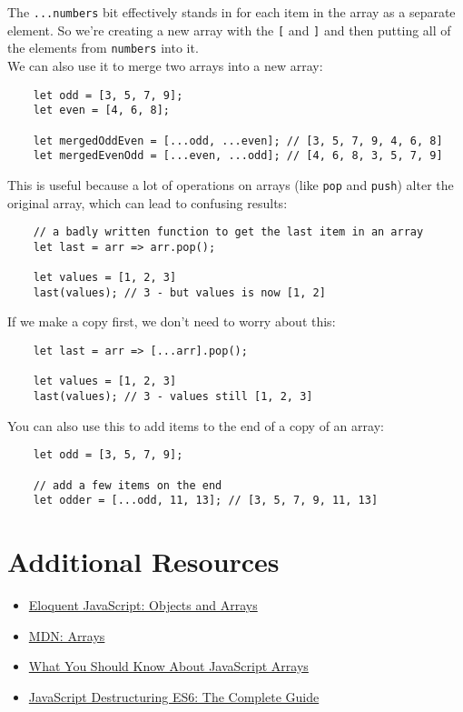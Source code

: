 The \texttt{...numbers} bit effectively stands in for each item in the array as a separate element. So we're creating a new array with the \texttt{[} and \texttt{]} and then putting all of the elements from \texttt{numbers} into it.
\\


We can also use it to merge two arrays into a new array:

\begin{verbatim}
    let odd = [3, 5, 7, 9];
    let even = [4, 6, 8];

    let mergedOddEven = [...odd, ...even]; // [3, 5, 7, 9, 4, 6, 8]
    let mergedEvenOdd = [...even, ...odd]; // [4, 6, 8, 3, 5, 7, 9]
\end{verbatim}

This is useful because a lot of operations on arrays (like \texttt{pop} and \texttt{push}) alter the original array, which can lead to confusing results:

\begin{verbatim}
    // a badly written function to get the last item in an array
    let last = arr => arr.pop();

    let values = [1, 2, 3]
    last(values); // 3 - but values is now [1, 2]
\end{verbatim}

\pagebreak

If we make a copy first, we don't need to worry about this:

\begin{verbatim}
    let last = arr => [...arr].pop();

    let values = [1, 2, 3]
    last(values); // 3 - values still [1, 2, 3]
\end{verbatim}

You can also use this to add items to the end of a copy of an array:

\begin{verbatim}
    let odd = [3, 5, 7, 9];

    // add a few items on the end
    let odder = [...odd, 11, 13]; // [3, 5, 7, 9, 11, 13]
\end{verbatim}

\section{Additional Resources}

\begin{itemize}[leftmargin=*]
    \item \href{https://eloquentjavascript.net/04_data.html}{Eloquent JavaScript: Objects and Arrays}
    \item \href{https://developer.mozilla.org/en-US/docs/Web/JavaScript/Reference/Global_Objects/Array}{MDN: Arrays}
    \item \href{https://thomlom.dev/what-you-should-know-about-js-arrays/}{What You Should Know About JavaScript Arrays}
    \item \href{https://buginit.com/javascript/javascript-destructuring-es6-the-complete-guide/}{JavaScript Destructuring ES6: The Complete Guide}
\end{itemize}

